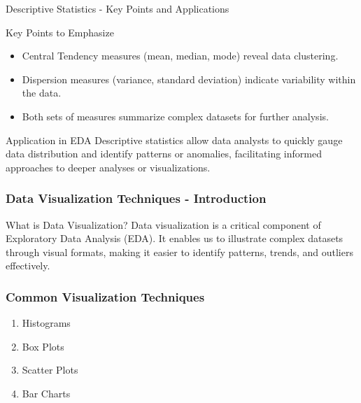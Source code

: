 \documentclass[aspectratio=169]{beamer}
\begin{document}
\begin{frame}[fragile]{Descriptive Statistics - Key Points and Applications}
    \begin{block}{Key Points to Emphasize}
        \begin{itemize}
            \item Central Tendency measures (mean, median, mode) reveal data clustering.
            \item Dispersion measures (variance, standard deviation) indicate variability within the data.
            \item Both sets of measures summarize complex datasets for further analysis.
        \end{itemize}
    \end{block}
    
    \begin{block}{Application in EDA}
        Descriptive statistics allow data analysts to quickly gauge data distribution and identify patterns or anomalies, facilitating informed approaches to deeper analyses or visualizations.
    \end{block}
\end{frame}

\begin{frame}
    \frametitle{Data Visualization Techniques - Introduction}
    \begin{block}{What is Data Visualization?}
        Data visualization is a critical component of Exploratory Data Analysis (EDA). It enables us to illustrate complex datasets through visual formats, making it easier to identify patterns, trends, and outliers effectively.
    \end{block}
\end{frame}

\begin{frame}
    \frametitle{Common Visualization Techniques}
    \begin{enumerate}
        \item Histograms
        \item Box Plots
        \item Scatter Plots
        \item Bar Charts
    \end{enumerate}
\end{frame}
\end{document}
